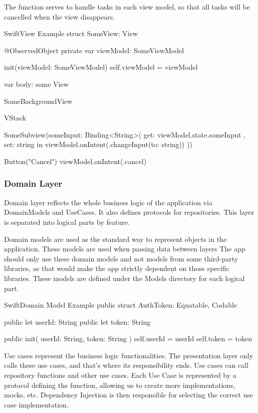 \documentclass[
  biblatex = false,
  language=english,
  figures=false,
  sourcecodes,
  glossaries,
  index
]{kidiplom}
\begin{document}
The  function serves to handle tasks in each view model, so that all tasks will be cancelled when the view disappears.

\FloatBarrier
\begin{kicode}{Swift}{}{View Example}
struct SomeView: View {

    @ObservedObject private var viewModel: SomeViewModel

    init(viewModel: SomeViewModel) {
        self.viewModel = viewModel
    }

    var body: some View {
        SomeBackgroundView {
            VStack {
                SomeSubview(someInput: Binding<String>(
                    get: { viewModel.state.someInput },
                    set: { string in viewModel.onIntent(.changeInput(to: string)) }
                ))

                Button("Cancel") {
                    viewModel.onIntent(.cancel)
                }
            }
        }
    }
}
\end{kicode}
\FloatBarrier

\subsubsection{Domain Layer}
Domain layer reflects the whole business logic of the application via DomainModels and UseCases. It also defines protocols for repositories. This layer is separated into logical parts by feature.

Domain models are used as the standard way to represent objects in the application. These models are used when passing data between layers
The app should only use these domain models and not models from some third-party libraries, as that would make the app strictly dependent on those specific libraries.  These models are defined under the Models directory for each logical part.

\FloatBarrier
\begin{kicode}{Swift}{}{Domain Model Example}
public struct AuthToken: Equatable, Codable {
    public let userId: String
    public let token: String
    
    public init(
        userId: String,
        token: String
    ) {
        self.userId = userId
        self.token = token
    }
}
\end{kicode}
\FloatBarrier

Use cases represent the business logic functionalities. The presentation layer only calls these use cases, and that's where its responsibility ends. Use cases can call repository functions and other use cases. Each Use Case is represented by a protocol defining the  function, allowing us to create more implementations, mocks, etc. Dependency Injection is then responsible for selecting the correct use case implementation. 
\end{document}
